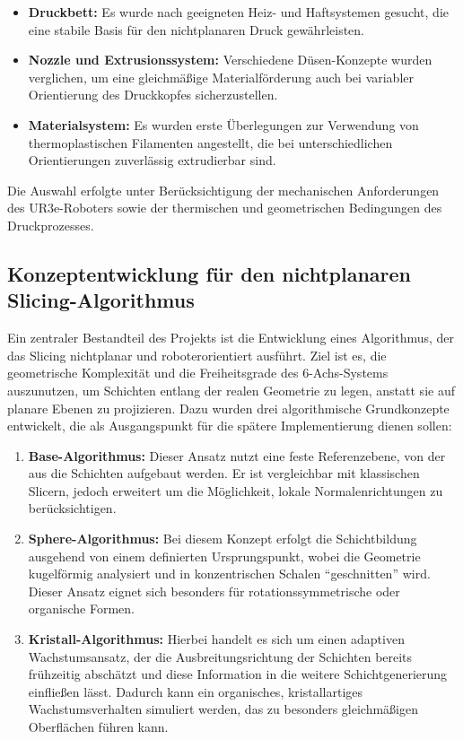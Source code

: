 \documentclass[
	paper=a4,
	fontsize=11pt,
	parskip=half,
	headings=normal,
	bibliography=totoc,
	listof=totoc
]{scrartcl}
\begin{document}
\begin{itemize}
    \item \textbf{Druckbett:} Es wurde nach geeigneten Heiz- und Haftsystemen gesucht, die eine stabile Basis für den nichtplanaren Druck gewährleisten.
    \item \textbf{Nozzle und Extrusionssystem:} Verschiedene Düsen\nobreakspace{}-Konzepte wurden verglichen, um eine gleichmäßige Materialförderung auch bei variabler Orientierung des Druckkopfes sicherzustellen.
    \item \textbf{Materialsystem:} Es wurden erste Überlegungen zur Verwendung von thermoplastischen Filamenten angestellt, die bei unterschiedlichen Orientierungen zuverlässig extrudierbar sind.
\end{itemize}

Die Auswahl erfolgte unter Berücksichtigung der mechanischen Anforderungen des UR3e-Roboters sowie der thermischen und geometrischen Bedingungen des Druckprozesses.

\subsection{Konzeptentwicklung für den nichtplanaren Slicing-Algorithmus}
	Ein zentraler Bestandteil des Projekts ist die Entwicklung eines Algorithmus, der das Slicing nichtplanar und roboterorientiert ausführt.
	Ziel ist es, die geometrische Komplexität und die Freiheitsgrade des 6-Achs-Systems auszunutzen, um Schichten entlang der realen Geometrie zu legen, anstatt sie auf planare Ebenen zu projizieren.
	Dazu wurden drei algorithmische Grundkonzepte entwickelt, die als Ausgangspunkt für die spätere Implementierung dienen sollen:
	\begin{enumerate}
		\item \textbf{Base-Algorithmus:} Dieser Ansatz nutzt eine feste Referenzebene, von der aus die Schichten aufgebaut werden. Er ist vergleichbar mit klassischen Slicern, jedoch erweitert um die Möglichkeit, lokale Normalenrichtungen zu berücksichtigen.
		\item \textbf{Sphere-Algorithmus:} Bei diesem Konzept erfolgt die Schichtbildung ausgehend von einem definierten Ursprungspunkt, wobei die Geometrie kugelförmig analysiert und in konzentrischen Schalen \enquote{geschnitten} wird. Dieser Ansatz eignet sich besonders für rotationssymmetrische oder organische Formen.
		\item \textbf{Kristall-Algorithmus:} Hierbei handelt es sich um einen adaptiven Wachstumsansatz, der die Ausbreitungsrichtung der Schichten bereits frühzeitig abschätzt und diese Information in die weitere Schichtgenerierung einfließen lässt. Dadurch kann ein organisches, kristallartiges Wachstumsverhalten simuliert werden, das zu besonders gleichmäßigen Oberflächen führen kann.
	\end{enumerate}
\end{document}
